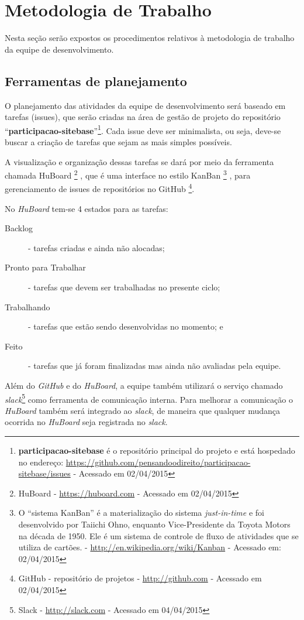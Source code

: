 \section{Metodologia de Trabalho}
Nesta seção serão expostos os procedimentos relativos à metodologia de trabalho da equipe de desenvolvimento.

\subsection{Ferramentas de planejamento}
O planejamento das atividades da equipe de desenvolvimento será baseado em tarefas (\glspl{issue}), que  serão criadas na área de gestão de projeto do repositório ``\textbf{participacao-sitebase}''\footnote{\textbf{participacao-sitebase} é o repositório principal do projeto e está hospedado no endereço: \url{https://github.com/pensandoodireito/participacao-sitebase/issues} - Acessado em 02/04/2015}. Cada \gls{issue} deve ser minimalista, ou seja, deve-se buscar a criação de tarefas que sejam as mais simples possíveis.

A visualização e organização dessas tarefas se dará por meio da ferramenta chamada HuBoard%
\footnote{HuBoard - \url{https://huboard.com} - Acessado em 02/04/2015}%
, que é uma interface no estilo KanBan%
\footnote{O ``sistema KanBan'' é a materialização do sistema \textit{just-in-time} e foi desenvolvido por Taiichi Ohno, enquanto Vice-Presidente da Toyota Motors na década de 1950. Ele é um sistema de controle de fluxo de atividades que se utiliza de cartões. - \url{http://en.wikipedia.org/wiki/Kanban} - Acessado em: 02/04/2015}
\cite{sugimori1977toyota},
para gerenciamento de \glspl{issue} de repositórios no GitHub%
\footnote{GitHub - repositório de projetos - \url{http://github.com} - Acessado em 02/04/2015}.

No \textit{HuBoard} tem-se 4 estados para as tarefas:
\begin{description}
\item[Backlog] - tarefas criadas e ainda não alocadas;
\item[Pronto para Trabalhar] - tarefas que devem ser trabalhadas no presente ciclo;
\item[Trabalhando] - tarefas que estão sendo desenvolvidas no momento; e
\item[Feito] - tarefas que já foram finalizadas mas ainda não avaliadas pela equipe.
\end{description}

Além do \textit{GitHub} e do \textit{HuBoard}, a equipe também utilizará o serviço chamado \textit{slack}\footnote{Slack - \url{http://slack.com} - Acessado em 04/04/2015} como ferramenta de comunicação interna. Para melhorar a comunicação o \textit{HuBoard} também será integrado ao \textit{slack}, de maneira que qualquer mudança ocorrida no \textit{HuBoard} seja registrada no \textit{slack}.

